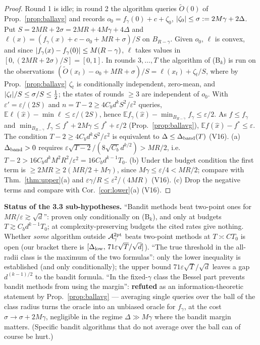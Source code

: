 \documentclass[11pt,a4paper]{article}
\numberwithin{equation}{section}
\theoremstyle{definition}
\theoremstyle{remark}
\newcommand{\E}{\mathbb E}\newcommand{\R}{\mathbb R}\newcommand{\Z}{\mathbb Z}\newcommand{\Prob}{\mathbb P}
\begin{document}
\begin{proof}
Round 1 is idle; in round 2 the algorithm queries $\tilde O(0)$ of Prop.~\ref{prop:ballavg} and records $o_0=f_\gamma(0)+c+\zeta_0$, $\lvert \zeta_0\rvert\le\sigma:=2M\gamma+2\Delta$. Put $S=2MR+2\sigma=2MR+4M\gamma+4\Delta$ and $\ell(x)=(f_\gamma(x)+c-o_0+MR+\sigma)/S$ on $B_{R-\gamma}$. Given $o_0$, $\ell$ is convex, and since $\lvert f_\gamma(x)-f_\gamma(0)\rvert\le M(R-\gamma)$, $\ell$ takes values in $[0,(2MR+2\sigma)/S]=[0,1]$. In rounds $3,\dots,T$ the algorithm of (B$_k$) is run on the observations $(\tilde O(x_t)-o_0+MR+\sigma)/S=\ell(x_t)+\zeta_t/S$, where by Prop.~\ref{prop:ballavg} $\zeta_t$ is conditionally independent, zero-mean, and $\lvert \zeta_t\rvert/S\le\sigma/S\le\frac12$; the states of rounds $\ge3$ are independent of $o_0$. With $\varepsilon'=\varepsilon/(2S)$ and $n=T-2\ge4C_bd^kS^2/\varepsilon^2$ queries, $\E\ell(\hat x)-\min\ell\le\varepsilon/(2S)$, hence $\E f_\gamma(\hat x)-\min_{B_{R-\gamma}}f_\gamma\le\varepsilon/2$. As $f\le f_\gamma$ and $\min_{B_{R-\gamma}}f_\gamma\le f^*+2M\gamma\le f^*+\varepsilon/2$ (Prop.~\ref{prop:ballavg}), $\E f(\hat x)-f^*\le\varepsilon$. The condition $T-2\ge4C_bd^kS^2/\varepsilon^2$ is equivalent to $\Delta\le\Delta_{\rm band}(T)$ (V16). (a) $\Delta_{\rm band}>0$ requires $\varepsilon\sqrt{T-2}/(8\sqrt{C_b}d^{k/2})>MR/2$, i.e.\ $T-2>16C_bd^kM^2R^2/\varepsilon^2=16C_bd^{k-1}T_0$. (b) Under the budget condition the first term is $\ge2MR\ge2(MR/2+M\gamma)$, since $M\gamma\le\varepsilon/4<MR/2$; compare with Thm.~\ref{thm:upper}(a) and $\varepsilon\gamma/R\le\varepsilon^2/(4MR)$ (V16). (c) Drop the negative terms and compare with Cor.~\ref{cor:lower}(a) (V16).
\end{proof}
\noindent\textbf{Status of the 3.3 sub-hypotheses.} ``Bandit methods beat two-point ones for $MR/\varepsilon\gtrsim\sqrt d$'': proven only conditionally on (B$_k$), and only at budgets $T\gtrsim C_bd^{k-1}T_0$; at complexity-preserving budgets the cited rates give nothing. Whether \emph{some} algorithm outside $\mathcal A^{\rm 2pt}_\gamma$ beats two-point methods at $T\asymp CT_0$ is open (our bracket there is $[\Delta_{\rm low},\,71\varepsilon\sqrt T/\sqrt d]$). ``The true threshold in the all-radii class is the maximum of the two formulas'': only the lower inequality is established (and only conditionally); the upper bound $71\varepsilon\sqrt T/\sqrt d$ leaves a gap $d^{(k-1)/2}$ to the bandit formula. ``In the fixed-$\gamma$ class the Bessel part prevents bandit methods from using the margin'': \textbf{refuted} as an information-theoretic statement by Prop.~\ref{prop:ballavg} --- averaging single queries over the ball of the class radius turns the oracle into an unbiased oracle for $f_\gamma$, at the cost $\sigma\to\sigma+2M\gamma$, negligible in the regime $\Delta\gg M\gamma$ where the bandit margin matters. (Specific bandit algorithms that do not average over the ball can of course be hurt.)
\end{document}
